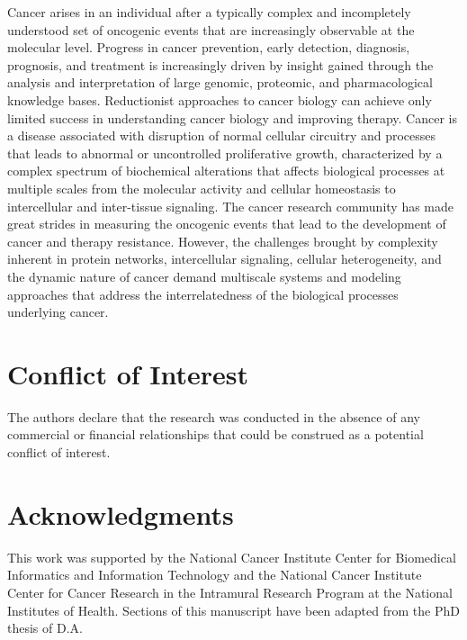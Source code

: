 \documentclass[10pt,letterpaper]{article}
\begin{document}
Cancer arises in an individual after a typically complex and
incompletely understood set of oncogenic events that are increasingly
observable at the molecular level. Progress in cancer prevention,
early detection, diagnosis, prognosis, and treatment is increasingly
driven by insight gained through the analysis and interpretation of
large genomic, proteomic, and pharmacological knowledge
bases. Reductionist approaches to cancer biology can achieve only
limited success in understanding cancer biology and improving
therapy. Cancer is a disease associated with disruption of normal
cellular circuitry and processes that leads to abnormal or
uncontrolled proliferative growth, characterized by a complex spectrum
of biochemical alterations that affects biological processes at
multiple scales from the molecular activity and cellular homeostasis
to intercellular and inter-tissue signaling. The cancer research
community has made great strides in measuring the oncogenic events
that lead to the development of cancer and therapy
resistance. However, the challenges brought by complexity inherent in
protein networks, intercellular signaling, cellular heterogeneity, and
the dynamic nature of cancer demand multiscale systems and modeling
approaches that address the interrelatedness of the biological
processes underlying cancer.

\section{Conflict of Interest}

The authors declare that the research was conducted in the absence of
any commercial or financial relationships that could be construed as a
potential conflict of interest.

\section{Acknowledgments}
This work was supported by the National Cancer Institute Center for
Biomedical Informatics and Information Technology and the National
Cancer Institute Center for Cancer Research in the Intramural Research
Program at the National Institutes of Health. Sections of this
manuscript have been adapted from the PhD thesis
\cite{Addepalli2014-oa} of D.A.

\printbibliography
\end{document}
